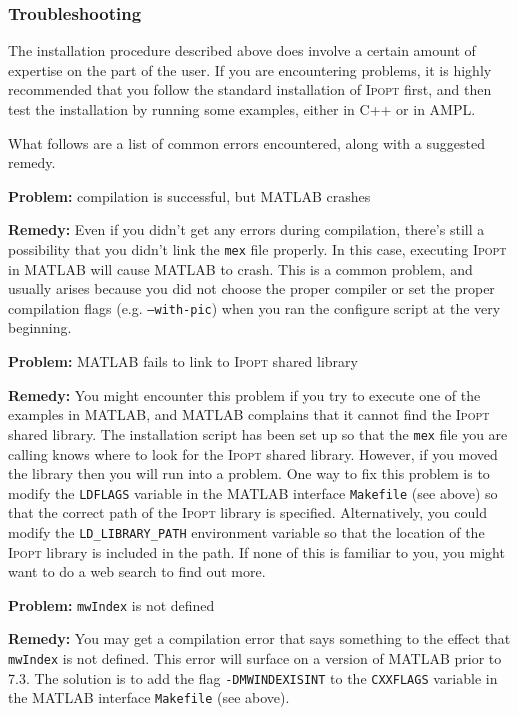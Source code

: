 \documentclass[10pt]{article}
\newcommand{\Ipopt}{\textsc{Ipopt}\xspace}
\newcommand{\Matlab}{\textsc{MATLAB}\xspace}
\begin{document}
\subsubsection{Troubleshooting}

The installation procedure described above does involve a certain amount of 
expertise on the part of the user. If you are encountering problems, it is 
highly recommended that you follow the standard installation of \Ipopt first, 
and then test the installation by running some examples, either in C++ or in 
AMPL.

What follows are a list of common errors encountered, along with a suggested remedy.
\medskip

\textbf{Problem:} compilation is successful, but \Matlab crashes

\textbf{Remedy:} Even if you didn't get any errors during compilation, there's 
still a possibility that you didn't link the {\tt mex} file properly. In this 
case, executing \Ipopt in \Matlab will cause \Matlab to crash. This is a 
common problem, and usually arises because you did not choose the proper 
compiler or set the proper compilation flags (e.g. {\tt --with-pic}) when you 
ran the configure script at the very beginning.
\medskip

\textbf{Problem:} \Matlab fails to link to \Ipopt shared library

\textbf{Remedy:} You might encounter this problem if you try to execute one of 
the examples in \Matlab, and \Matlab complains that it cannot find the \Ipopt 
shared library. The installation script has been set up so that the {\tt mex} 
file you are calling knows where to look for the \Ipopt shared library. 
However, if you moved the library then you will run into a problem. One way to 
fix this problem is to modify the {\tt LDFLAGS} variable in the \Matlab 
interface {\tt Makefile} (see above) so that the correct path of the \Ipopt 
library is specified. Alternatively, you could modify the
{\tt LD\_LIBRARY\_PATH} environment variable so that the location of the 
\Ipopt library is included in the path. If none of this is familiar to you, 
you might want to do a web search to find out more.
\medskip

\textbf{Problem:} {\tt mwIndex} is not defined

\textbf{Remedy:} You may get a compilation error that says something to the 
effect that {\tt mwIndex} is not defined. This error will surface on a version 
of \Matlab prior to 7.3. The solution is to add the flag {\tt -DMWINDEXISINT} 
to the {\tt CXXFLAGS} variable in the \Matlab interface {\tt Makefile} (see 
above).
\end{document}
